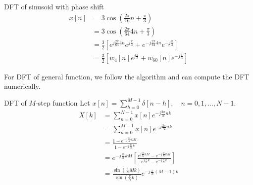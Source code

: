 \documentclass[../main.tex]{subfiles}
\begin{document}
\begin{pbox}{DFT of sinusoid with phase shift}
\begin{align*}
    x[n] &=3\cos \left(\frac{2\pi}{16}n+\frac{\pi}{3}\right)\\
    &=3\cos \left(\frac{2\pi}{64}4n + \frac{\pi}{3}\right)\\
    &=\frac{3}{2}\left[e^{j\frac{2\pi}{64}4n}e^{j\frac{\pi}{3}}+e^{-j\frac{2\pi}{64}4n}e^{-j\frac{\pi}{3}}\right]\\
    &=\frac{3}{2}\left[w_4[n]e^{j\frac{\pi}{3}}+w_{60}[n]e^{-j\frac{\pi}{3}}\right]
\end{align*}
\begin{remark}
    For DFT of general function, we follow the algorithm and can compute the DFT numerically. 
\end{remark}
\end{pbox}
\begin{pbox}{DFT of $M$-step function}
    Let $x[n]=\sum_{h=0}^{M-1}\delta[n-h],\quad n=0,1,\dots,N-1$.
    \begin{align*}
        X[k]&=\sum_{n=0}^{N-1}x[n]e^{-j\frac{2\pi}{N}nk}\\
        &=\sum_{n=0}^{M-1}x[n]e^{-j\frac{2\pi}{N}nk}\\
        &=\frac{1-e^{-j\frac{2\pi}{N}kM}}{1-e^{-j\frac{2\pi}{N}k}}\\
        &= e^{-j \frac{\pi}{N} k M} \left[ \frac{e^{j \frac{\pi}{N} k M} - e^{-j \frac{\pi}{N} k M}}{e^{j \frac{\pi}{N} k} - e^{-j \frac{\pi}{N} k}} \right]\\
        &= \frac{\sin\left( \frac{\pi}{N} M k \right)}{\sin\left( \frac{\pi}{N} k \right)} e^{-j \frac{\pi}{N} (M - 1) k}
    \end{align*}
\end{pbox}
\end{document}
